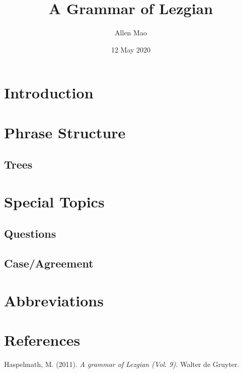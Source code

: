 \documentclass[12pt, letterpaper]{article}
\title{A Grammar of Lezgian}
\author{Allen Mao}
\date{12 May 2020}
\begin{document}
\maketitle
\tableofcontents
\section{Introduction}

\section{Phrase Structure}

\subsection{Trees}
\label{subsec:trees}

\section{Special Topics}
\label{sec:spec-topics}
\subsection{Questions}

\subsection{Case/Agreement}

\section{Abbreviations}
\printglossaries
\section{References}
\begin{thebibliography}{}
Haspelmath, M. (2011). \textit{A grammar of Lezgian (Vol. 9).} Walter de Gruyter.

\end{thebibliography}
\end{document}
